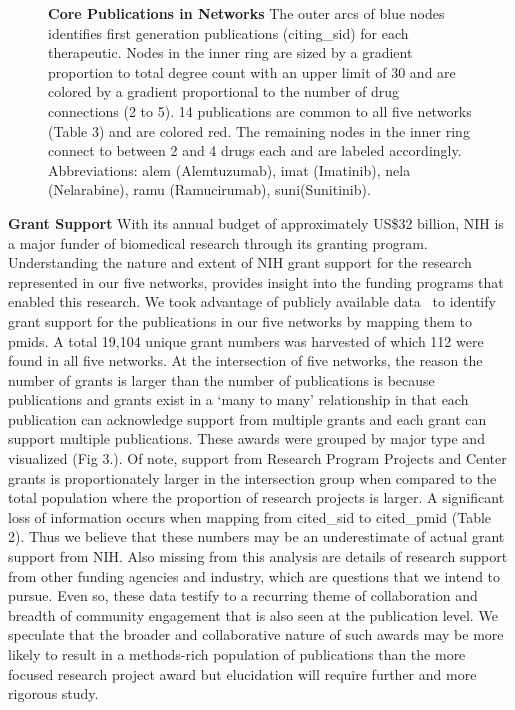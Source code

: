 \documentclass[10pt,letterpaper]{article}
\begin{document}
\begin{figure}[!h]
\centering
\caption{{\bf Core Publications in Networks}  The outer arcs of blue nodes identifies first generation publications (citing\_sid) for each therapeutic. Nodes in the inner ring are sized by a gradient proportion to total degree count with an upper limit of 30 and are colored by a gradient proportional to the number of drug connections (2 to 5). 14  publications are common to all five networks (Table 3) and are colored red. The remaining nodes in the inner ring connect to between 2 and 4 drugs each and are labeled accordingly. Abbreviations: alem (Alemtuzumab), imat (Imatinib), nela (Nelarabine), ramu (Ramucirumab), suni(Sunitinib).}
\label{fig2}
\end{figure}

\textbf{Grant Support} With its annual budget of approximately US\$32 billion, NIH is a major funder of biomedical research through its granting program. Understanding the nature and extent of NIH grant support for the research represented in our five networks, provides insight into the funding programs that enabled this research. We took advantage of publicly available data~\cite{bibNIHExPORTER} to identify grant support for the publications in our five networks by mapping them to pmids. A total 19,104 unique grant numbers was harvested of which 112 were found in all five networks. At the intersection of five networks, the reason the number of grants is larger than the number of publications is because publications and grants exist in a `many to many' relationship in that each publication can acknowledge support from multiple grants and each grant can support multiple publications. These awards were grouped by major type  and visualized (Fig 3.). Of note, support from Research Program Projects and Center grants is proportionately larger in the intersection group when compared to the total population where the proportion of research projects is larger. A significant loss of information occurs when mapping from cited\_sid to cited\_pmid (Table 2). Thus we believe that these numbers may be an underestimate of actual grant support from NIH. Also missing from this analysis are details of research support from other funding agencies and industry, which are questions that we intend to pursue. Even so, these data testify to a recurring theme of collaboration and breadth of community engagement that is also seen at the publication level. We speculate that the broader and collaborative nature of such awards may be more likely to result in a methods-rich population of publications than the more focused research project award but elucidation will require further and more rigorous study. 
\end{document}
